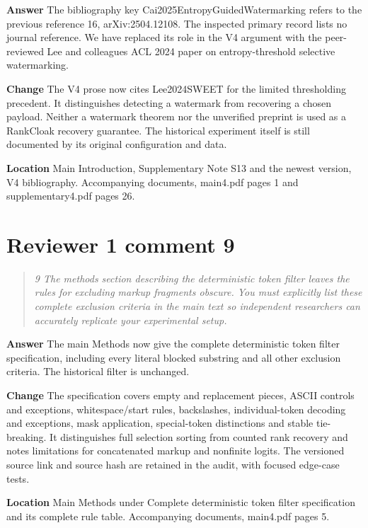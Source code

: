 \documentclass[11pt]{article}
\newenvironment{reviewcomment}{\begin{quote}\color{commentgray}\itshape}{\end{quote}}
\begin{document}
\textbf{Answer } The bibliography key Cai2025EntropyGuidedWatermarking refers to the previous reference 16, arXiv:2504.12108. The inspected primary record lists no journal reference. We have replaced its role in the V4 argument with the peer-reviewed Lee and colleagues ACL 2024 paper on entropy-threshold selective watermarking.

\textbf{Change} The V4 prose now cites Lee2024SWEET for the limited thresholding precedent. It distinguishes detecting a watermark from recovering a chosen payload. Neither a watermark theorem nor the unverified preprint is used as a RankCloak recovery guarantee. The historical experiment itself is still documented by its original configuration and data.

\textbf{Location} Main Introduction, Supplementary Note S13 and the newest version, V4 bibliography. Accompanying documents, main4.pdf pages 1 and supplementary4.pdf pages 26.


\section*{Reviewer 1 comment 9}\label{resp:R1-9}
\begin{reviewcomment}
9 The methods section describing the deterministic token filter leaves the rules for excluding markup fragments obscure. You must explicitly list these complete exclusion criteria in the main text so independent researchers can accurately replicate your experimental setup.
\end{reviewcomment}

\textbf{Answer} The main Methods now give the complete deterministic token filter specification, including every literal blocked substring and all other exclusion criteria. The historical filter is unchanged.

\textbf{Change} The specification covers empty and replacement pieces, ASCII controls and exceptions, whitespace/start rules, backslashes, individual-token decoding and exceptions, mask application, special-token distinctions and stable tie-breaking. It distinguishes full selection sorting from counted rank recovery and notes limitations for concatenated markup and nonfinite logits. The versioned source link and source hash are retained in the audit, with focused edge-case tests.

\textbf{Location} Main Methods under Complete deterministic token filter specification and its complete rule table. Accompanying documents, main4.pdf pages 5.
\end{document}
